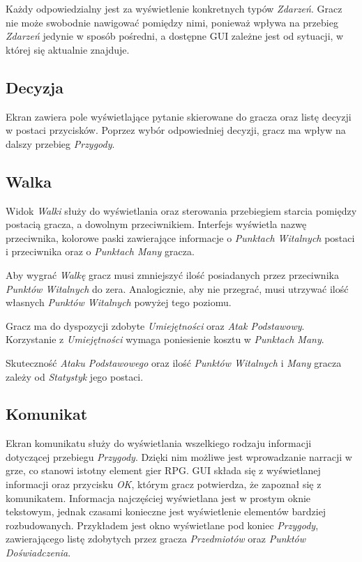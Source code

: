 \documentclass[openright]{xmgr}
\begin{document}
Każdy odpowiedzialny jest za wyświetlenie konkretnych typów \textit{Zdarzeń}. Gracz nie może swobodnie nawigować pomiędzy nimi, ponieważ wpływa na przebieg \textit{Zdarzeń} jedynie w sposób pośredni, a dostępne GUI zależne jest od sytuacji, w której się aktualnie znajduje.
\subsection*{Decyzja}
Ekran zawiera pole wyświetlające pytanie skierowane do gracza oraz listę decyzji w postaci przycisków. Poprzez wybór odpowiedniej decyzji, gracz ma wpływ na dalszy przebieg \textit{Przygody}.
\subsection*{Walka}
Widok \textit{Walki} służy do wyświetlania oraz sterowania przebiegiem starcia pomiędzy postacią gracza, a dowolnym przeciwnikiem. Interfejs wyświetla nazwę przeciwnika, kolorowe paski zawierające informacje o \textit{Punktach Witalnych} postaci i przeciwnika oraz o \textit{Punktach Many} gracza. 

Aby wygrać \textit{Walkę} gracz musi zmniejszyć ilość posiadanych przez przeciwnika \textit{Punktów Witalnych} do zera. Analogicznie, aby nie przegrać, musi utrzywać ilość własnych \textit{Punktów Witalnych}
powyżej tego poziomu.

Gracz ma do dyspozycji zdobyte \textit{Umiejętności} oraz \textit{Atak Podstawowy}. Korzystanie z \textit{Umiejętności} wymaga poniesienie kosztu w \textit{Punktach Many}.

Skuteczność \textit{Ataku Podstawowego} oraz ilość \textit{Punktów Witalnych} i \textit{Many} gracza zależy od \textit{Statystyk} jego postaci.

\subsection*{Komunikat}

Ekran komunikatu służy do wyświetlania wszelkiego rodzaju informacji dotyczącej przebiegu \textit{Przygody}. Dzięki nim możliwe jest wprowadzanie narracji w grze, co stanowi istotny element gier RPG. GUI składa się z wyświetlanej informacji oraz przycisku \textit{OK}, którym gracz potwierdza, że zapoznał się z komunikatem. Informacja najczęściej wyświetlana jest w prostym oknie tekstowym, jednak czasami konieczne jest wyświetlenie elementów bardziej rozbudowanych. Przykładem jest okno wyświetlane pod koniec \textit{Przygody}, zawierającego listę zdobytych przez gracza \textit{Przedmiotów} oraz \textit{Punktów Doświadczenia}.
\end{document}
